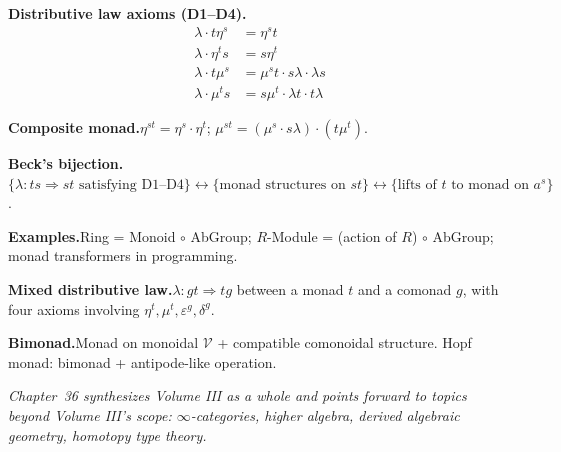 \begin{formalrestatement}
\textbf{Distributive law axioms (D1--D4).}\quad
\begin{align*}
  \lambda \cdot t \eta^s &= \eta^s t \\
  \lambda \cdot \eta^t s &= s \eta^t \\
  \lambda \cdot t \mu^s &= \mu^s t \cdot s \lambda \cdot \lambda s \\
  \lambda \cdot \mu^t s &= s \mu^t \cdot \lambda t \cdot t \lambda
\end{align*}

\medskip
\textbf{Composite monad.}\quad $\eta^{st} = \eta^s \cdot \eta^t$;
$\mu^{st} = (\mu^s \cdot s\lambda) \cdot (t\mu^t)$.

\medskip
\textbf{Beck's bijection.}\quad
$\{\lambda : ts \Rightarrow st \text{ satisfying D1--D4}\}
\leftrightarrow \{\text{monad structures on } st\}
\leftrightarrow \{\text{lifts of } t \text{ to monad on } a^s\}$.

\medskip
\textbf{Examples.}\quad Ring = Monoid $\circ$ AbGroup; $R$-Module = (action of $R$)
$\circ$ AbGroup; monad transformers in programming.

\medskip
\textbf{Mixed distributive law.}\quad $\lambda : gt \Rightarrow tg$ between a
monad $t$ and a comonad $g$, with four axioms involving $\eta^t, \mu^t,
\varepsilon^g, \delta^g$.

\medskip
\textbf{Bimonad.}\quad Monad on monoidal $\mathcal{V}$ + compatible
comonoidal structure. Hopf monad: bimonad + antipode-like operation.

\medskip
\noindent\textit{Chapter~36 synthesizes Volume III as a whole and points
forward to topics beyond Volume III's scope: $\infty$-categories, higher
algebra, derived algebraic geometry, homotopy type theory.}
\end{formalrestatement}
